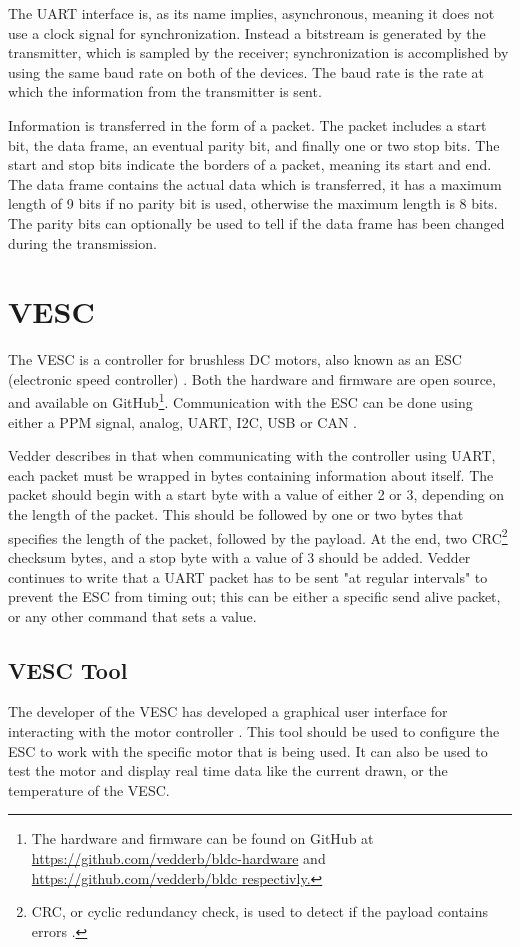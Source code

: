 The UART interface is, as its name implies, asynchronous, meaning it does not use a clock signal for synchronization. Instead a bitstream is generated by the transmitter, which is sampled by the receiver; synchronization is accomplished by using the same baud rate on both of the devices.
The baud rate is the rate at which the information from the transmitter is sent.

Information is transferred in the form of a packet. The packet includes a start bit, the data frame, an eventual parity bit, and finally one or two stop bits. The start and stop bits indicate the borders of a packet, meaning its start and end. The data frame contains the actual data which is transferred, it has a maximum length of 9 bits if no parity bit is used, otherwise the maximum length is 8 bits. The parity bits can optionally be used to tell if the data frame has been changed during the transmission.

\section{VESC}
The VESC is a controller for brushless DC motors, also known as an ESC (electronic speed controller) \cite{Vedder2014AESC}. Both the hardware and firmware are open source, and available on GitHub\footnote{The hardware and firmware can be found on GitHub at \url{https://github.com/vedderb/bldc-hardware} and \url{https://github.com/vedderb/bldc respectivly.}}. Communication with the ESC can be done using either a PPM signal, analog, UART, I2C, USB or CAN \cite{Vedder2016VESCESC}.

Vedder describes in \cite{Vedder2015CommunicatingUART} that when communicating with the controller using UART, each packet must be wrapped in bytes containing information about itself. The packet should begin with a start byte with a value of either 2 or 3, depending on the length of the packet. This should be followed by one or two bytes that specifies the length of the packet, followed by the payload. At the end, two CRC\footnote{CRC, or cyclic redundancy check, is used to detect if the payload contains errors \cite{Technopedia2020WhatCRC}.} checksum bytes, and a stop byte with a value of 3 should be added. Vedder continues to write that a UART packet has to be sent "at regular intervals" to prevent the ESC from timing out; this can be either a specific send alive packet, or any other command that sets a value.

\subsection{VESC Tool}
The developer of the VESC has developed a graphical user interface for interacting with the motor controller \cite{Vedder2016VESCESC}. This tool should be used to configure the ESC to work with the specific motor that is being used. It can also be used to test the motor and display real time data like the current drawn, or the temperature of the VESC.